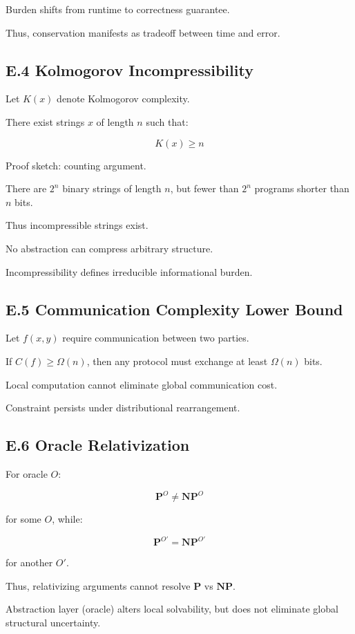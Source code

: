\documentclass[11pt,openany]{book}
\begin{document}
Burden shifts from runtime to correctness guarantee.

Thus, conservation manifests as tradeoff between time and error.

\subsection{E.4 Kolmogorov Incompressibility}

Let $K(x)$ denote Kolmogorov complexity.

There exist strings $x$ of length $n$ such that:

\[
K(x) \ge n
\]

Proof sketch: counting argument.

There are $2^n$ binary strings of length $n$,
but fewer than $2^n$ programs shorter than $n$ bits.

Thus incompressible strings exist.

No abstraction can compress arbitrary structure.

Incompressibility defines irreducible informational burden.

\subsection{E.5 Communication Complexity Lower Bound}

Let $f(x,y)$ require communication between two parties.

If $C(f) \ge \Omega(n)$, then any protocol must exchange 
at least $\Omega(n)$ bits.

Local computation cannot eliminate global communication cost.

Constraint persists under distributional rearrangement.

\subsection{E.6 Oracle Relativization}

For oracle $O$:

\[
\textbf{P}^O \neq \textbf{NP}^O
\]

for some $O$,
while:

\[
\textbf{P}^{O'} = \textbf{NP}^{O'}
\]

for another $O'$.

Thus, relativizing arguments cannot resolve $\textbf{P}$ vs $\textbf{NP}$.

Abstraction layer (oracle) alters local solvability,
but does not eliminate global structural uncertainty.
\end{document}
